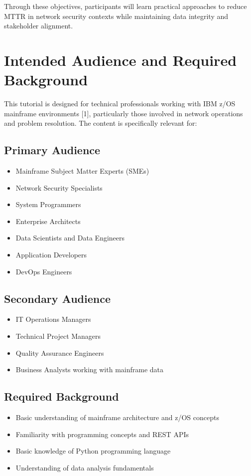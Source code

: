\documentclass[a4paper]{article}
\begin{document}
    Through these objectives, participants will learn practical approaches to reduce MTTR in network security contexts while maintaining data integrity and stakeholder alignment.

\section{Intended Audience and Required Background}
    This tutorial is designed for technical professionals working with IBM z/OS mainframe environments [1], particularly those involved in network operations and problem resolution. The content is specifically relevant for:

\subsection{Primary Audience}
    \begin{itemize}
        \item Mainframe Subject Matter Experts (SMEs)
        \item Network Security Specialists
        \item System Programmers
        \item Enterprise Architects
        \item Data Scientists and Data Engineers
        \item Application Developers
        \item DevOps Engineers
    \end{itemize}

\subsection{Secondary Audience}
    \begin{itemize}
        \item IT Operations Managers
        \item Technical Project Managers
        \item Quality Assurance Engineers
        \item Business Analysts working with mainframe data
    \end{itemize}

\subsection{Required Background}
    \begin{itemize}
        \item Basic understanding of mainframe architecture and z/OS concepts
        \item Familiarity with programming concepts and REST APIs
        \item Basic knowledge of Python programming language
        \item Understanding of data analysis fundamentals
    \end{itemize}
    
\end{document}
